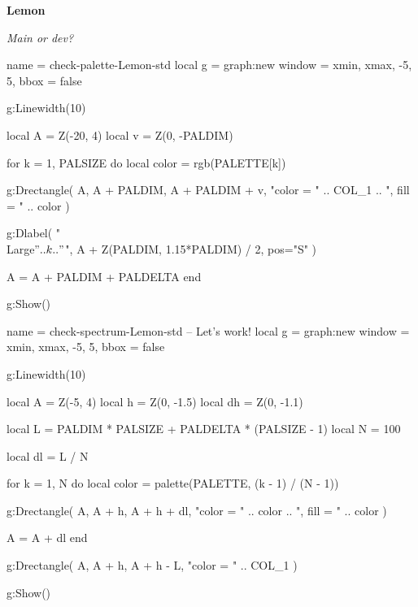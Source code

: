 \documentclass{tutodoc}
\newcommand{\PALETTE}{Lemon}
\newcommand{\SRC}{Main or dev?}
\begin{document}
\pagestyle{empty}
\centering








{\Huge\bfseries\PALETTE\vphantom{g}}

\medskip

{\Huge\itshape \SRC}



\bigskip
\bigskip

\begin{luadraw}{name = check-palette-\PALETTE-std}
local g = graph:new{
  window = {xmin, xmax, -5, 5},
  bbox   = false
}

g:Linewidth(10)

local A = Z(-20, 4)
local v = Z(0, -PALDIM)

for k = 1, PALSIZE do
  local color = rgb(PALETTE[k])

  g:Drectangle(
    A, A + PALDIM, A + PALDIM + v,
    "color = " .. COL_1 .. ", fill = " .. color
  )

  g:Dlabel(
    "\\Large$" .. k .. "$",
    A + Z(PALDIM, 1.15*PALDIM) / 2,
    {pos="S"}
  )

  A = A + PALDIM + PALDELTA
end

g:Show()
\end{luadraw}



\bigskip
\bigskip

\begin{luadraw}{name = check-spectrum-\PALETTE-std}
-- Let's work!
local g = graph:new{
  window = {xmin, xmax, -5, 5},
  bbox   = false
}

g:Linewidth(10)

local A  = Z(-5, 4)
local h  = Z(0, -1.5)
local dh = Z(0, -1.1)

local L = PALDIM * PALSIZE + PALDELTA * (PALSIZE - 1)
local N = 100

local dl = L / N

for k = 1, N do
  local color = palette(PALETTE, (k - 1) / (N - 1))

  g:Drectangle(
    A, A + h, A + h + dl,
    "color = " .. color .. ", fill = " .. color
  )

  A = A + dl
end

g:Drectangle(
  A, A + h, A + h - L,
  "color = " .. COL_1
)

g:Show()
\end{luadraw}
\end{document}
